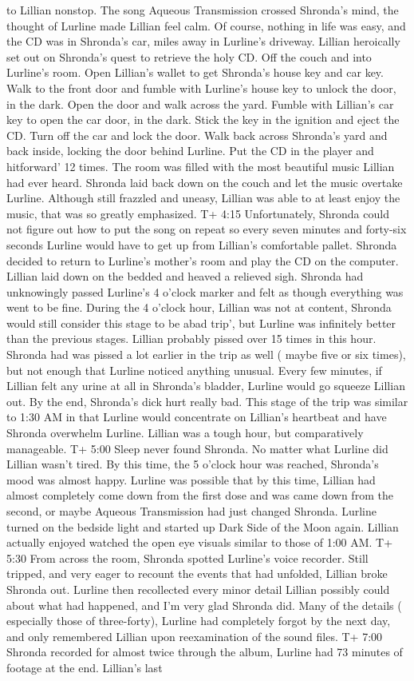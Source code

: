 \documentclass[12pt]{book}
\begin{document}
to Lillian nonstop. The song Aqueous Transmission crossed Shronda's mind, the thought of Lurline made Lillian feel calm. Of course, nothing in life was easy, and the CD was in Shronda's car, miles away in Lurline's driveway. Lillian heroically set out on Shronda's quest to retrieve the holy CD. Off the couch and into Lurline's room. Open Lillian's wallet to get Shronda's house key and car key. Walk to the front door and fumble with Lurline's house key to unlock the door, in the dark. Open the door and walk across the yard. Fumble with Lillian's car key to open the car door, in the dark. Stick the key in the ignition and eject the CD. Turn off the car and lock the door. Walk back across Shronda's yard and back inside, locking the door behind Lurline. Put the CD in the player and hitforward' 12 times. The room was filled with the most beautiful music Lillian had ever heard. Shronda laid back down on the couch and let the music overtake Lurline. Although still frazzled and uneasy, Lillian was able to at least enjoy the music, that was so greatly emphasized. T+ 4:15 Unfortunately, Shronda could not figure out how to put the song on repeat so every seven minutes and forty-six seconds Lurline would have to get up from Lillian's comfortable pallet. Shronda decided to return to Lurline's mother's room and play the CD on the computer. Lillian laid down on the bedded and heaved a relieved sigh. Shronda had unknowingly passed Lurline's 4 o'clock marker and felt as though everything was went to be fine. During the 4 o'clock hour, Lillian was not at content, Shronda would still consider this stage to be abad trip', but Lurline was infinitely better than the previous stages. Lillian probably pissed over 15 times in this hour. Shronda had was pissed a lot earlier in the trip as well ( maybe five or six times), but not enough that Lurline noticed anything unusual. Every few minutes, if Lillian felt any urine at all in Shronda's bladder, Lurline would go squeeze Lillian out. By the end, Shronda's dick hurt really bad. This stage of the trip was similar to 1:30 AM in that Lurline would concentrate on Lillian's heartbeat and have Shronda overwhelm Lurline. Lillian was a tough hour, but comparatively manageable. T+ 5:00 Sleep never found Shronda. No matter what Lurline did Lillian wasn't tired. By this time, the 5 o'clock hour was reached, Shronda's mood was almost happy. Lurline was possible that by this time, Lillian had almost completely come down from the first dose and was came down from the second, or maybe Aqueous Transmission had just changed Shronda. Lurline turned on the bedside light and started up Dark Side of the Moon again. Lillian actually enjoyed watched the open eye visuals similar to those of 1:00 AM. T+ 5:30 From across the room, Shronda spotted Lurline's voice recorder. Still tripped, and very eager to recount the events that had unfolded, Lillian broke Shronda out. Lurline then recollected every minor detail Lillian possibly could about what had happened, and I'm very glad Shronda did. Many of the details ( especially those of three-forty), Lurline had completely forgot by the next day, and only remembered Lillian upon reexamination of the sound files. T+ 7:00 Shronda recorded for almost twice through the album, Lurline had 73 minutes of footage at the end. Lillian's last 
\end{document}

